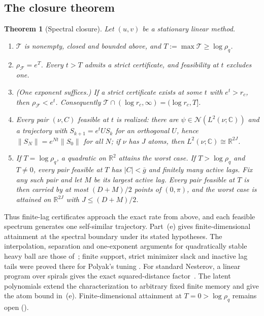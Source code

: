 \documentclass[11pt]{article}
\newtheorem{theorem}{Theorem}[section]
\theoremstyle{definition}
\theoremstyle{remark}
\newcommand{\R}{\mathbb R}
\newcommand{\C}{\mathbb C}
\newcommand{\cF}{\mathcal F}
\newcommand{\cS}{\mathcal N}\newcommand{\Szero}{\mathcal S_0}
\newcommand{\cT}{\mathcal T}
\newcommand{\norm}[1]{\lVert #1\rVert}
\newcommand{\rhoF}{\rho_{\cF}}
\begin{document}
\subsection{The closure theorem}

\begin{theorem}[Spectral closure]\label{thm:A}
Let \((u,v)\) be a stationary linear method.
\begin{enumerate}[label=\textup{(\alph*)}]
\item \(\cT\) is nonempty, closed and bounded above, and
\(T:=\max\cT\ge\log\rho_q\).
\item \(\rhoF=e^T\).  Every \(t>T\) admits a strict certificate, and
feasibility at \(t\) excludes one.
\item \textup{(One exponent suffices.)}  If a strict certificate exists at
some \(t\) with \(e^t>r_c\), then \(\rhoF<e^t\).  Consequently
\(\cT\cap(\log r_c,\infty)=(\log r_c,T]\).
\item Every pair \((\nu,C)\) feasible at \(t\) is realized: there are
\(\psi\in\cS(L^2(\nu;\C))\) and a trajectory with \(S_{k+1}=e^tUS_k\) for an
orthogonal \(U\), hence \(\norm{S_N}=e^{Nt}\norm{S_0}\) for all \(N\); if
\(\nu\) has \(J\) atoms, then \(L^2(\nu;\C)\cong\R^{2J}\).
\item If \(T=\log\rho_q\), a quadratic on \(\R^2\) attains the worst case.
If \(T>\log\rho_q\) and \(T\ne0\), every pair feasible at \(T\) has
\(|C|<\bar g\) and finitely many active lags.  Fix any such pair and let
\(M\) be its largest active lag.  Every pair feasible at \(T\) is then
carried by at most \((D+M)/2\) points of \((0,\pi)\), and the worst case
is attained on \(\R^{2J}\) with \(J\le(D+M)/2\).
\end{enumerate}
\end{theorem}

Thus finite-lag certificates approach the exact rate from above, and each
feasible spectrum generates one self-similar trajectory.  Part~(e) gives
finite-dimensional attainment at the spectral boundary under its stated
hypotheses.  The interpolation, separation and one-exponent arguments
for quadratically stable heavy ball are those of~\cite[Theorems~2.5, 3.2
and Lemmas~A.3--A.7]{TA}; finite support, strict minimizer slack and
inactive lag tails were proved there for Polyak's tuning
\cite[Lemma~A.10]{TA}.  For standard Nesterov, a linear program over spirals gives the exact
squared-distance factor~\cite[Theorem~4.1]{PS26}.  The latent polynomials
extend the characterization to arbitrary fixed finite memory and give the
atom bound in~(e).  Finite-dimensional attainment at \(T=0>\log\rho_q\) remains open
().
\end{document}
